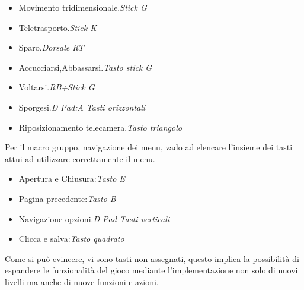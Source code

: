 \documentclass[
a4paper,
cleardoublepage=empty,
headings=twolinechapter,
numbers=autoenddot,
]{scrbook}
\begin{document}
	\begin{itemize}
		\item Movimento tridimensionale.\textit{Stick G}
		\item Teletrasporto.\textit{Stick K}
		\item Sparo.\textit{Dorsale RT}
		\item Accucciarsi,Abbassarsi.\textit{Tasto stick G}
		\item Voltarsi.\textit{RB+Stick G}
		\item Sporgesi.\textit{D Pad:A Tasti orizzontali}
		\item Riposizionamento telecamera.\textit{Tasto triangolo}
	\end{itemize}
	Per il macro gruppo, navigazione dei menu, vado ad elencare l'insieme dei tasti attui ad utilizzare correttamente il menu.
	\begin{itemize}
		\item Apertura e Chiusura:\textit{Tasto E}
		\item Pagina precedente:\textit{Tasto B}
		\item Navigazione opzioni.\textit{D Pad Tasti verticali}
		\item Clicca e salva:\textit{Tasto quadrato}
	\end{itemize}
	Come si può evincere, vi sono tasti non assegnati, questo implica la possibilità di espandere le funzionalità del gioco mediante l'implementazione non solo di nuovi livelli ma anche di nuove funzioni e azioni.
\end{document}
